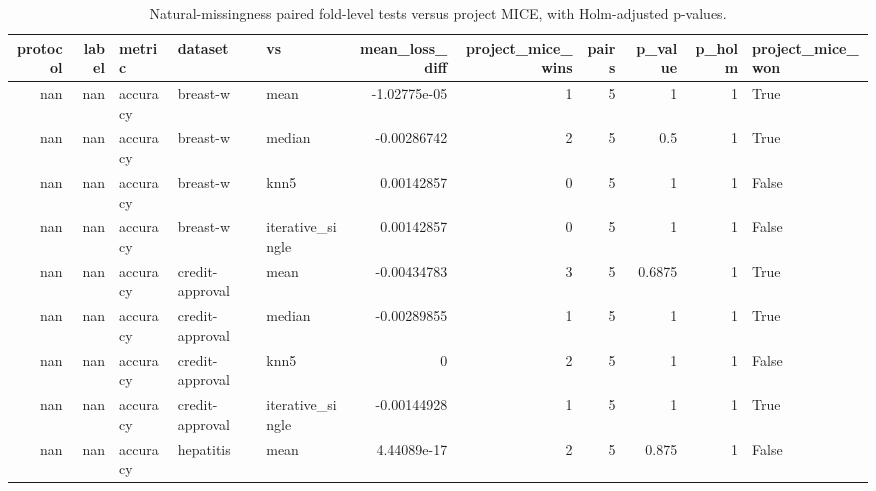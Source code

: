 \begin{table}[ht]
\centering
\caption{Natural-missingness paired fold-level tests versus project MICE, with Holm-adjusted p-values.}
\label{tab:protocol_b_natural_missingness_significance}
\begin{tabular}{rrlllrrrrrl}
\hline
   protocol &   label & metric                         & dataset         & vs               &   mean\_loss\_diff &   project\_mice\_wins &   pairs &   p\_value &   p\_holm & project\_mice\_won   \\
\hline
        nan &     nan & accuracy                       & breast-w        & mean             &     -1.02775e-05 &                   1 &       5 &    1      &        1 & True               \\
        nan &     nan & accuracy                       & breast-w        & median           &     -0.00286742  &                   2 &       5 &    0.5    &        1 & True               \\
        nan &     nan & accuracy                       & breast-w        & knn5             &      0.00142857  &                   0 &       5 &    1      &        1 & False              \\
        nan &     nan & accuracy                       & breast-w        & iterative\_single &      0.00142857  &                   0 &       5 &    1      &        1 & False              \\
        nan &     nan & accuracy                       & credit-approval & mean             &     -0.00434783  &                   3 &       5 &    0.6875 &        1 & True               \\
        nan &     nan & accuracy                       & credit-approval & median           &     -0.00289855  &                   1 &       5 &    1      &        1 & True               \\
        nan &     nan & accuracy                       & credit-approval & knn5             &      0           &                   2 &       5 &    1      &        1 & False              \\
        nan &     nan & accuracy                       & credit-approval & iterative\_single &     -0.00144928  &                   1 &       5 &    1      &        1 & True               \\
        nan &     nan & accuracy                       & hepatitis       & mean             &      4.44089e-17 &                   2 &       5 &    0.875  &        1 & False              \\

\end{tabular}
\end{table}
